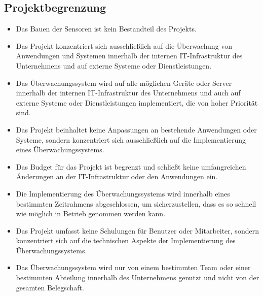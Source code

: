 \begin{flushleft}
\subsection{Projektbegrenzung}
\begin{itemize}
	\item Das Bauen der Sensoren ist kein Bestandteil des Projekts.
	\item Das Projekt konzentriert sich ausschließlich auf die Überwachung von Anwendungen und Systemen innerhalb der internen IT-Infrastruktur des Unternehmens und auf externe Systeme oder Dienstleistungen.
	\item Das Überwachungssystem wird auf alle möglichen Geräte oder Server innerhalb der internen IT-Infrastruktur des Unternehmens und auch auf externe Systeme oder Dienstleistungen implementiert, die von hoher Priorität sind.
	\item Das Projekt beinhaltet keine Anpassungen an bestehende Anwendungen oder Systeme, sondern konzentriert sich ausschließlich auf die Implementierung eines Überwachungssystems.
	\item Das Budget für das Projekt ist begrenzt und schließt keine umfangreichen Änderungen an der IT-Infrastruktur oder den Anwendungen ein.
	\item Die Implementierung des Überwachungssystems wird innerhalb eines bestimmten Zeitrahmens abgeschlossen, um sicherzustellen, dass es so schnell wie möglich in Betrieb genommen werden kann.
	\item Das Projekt umfasst keine Schulungen für Benutzer oder Mitarbeiter, sondern konzentriert sich auf die technischen Aspekte der Implementierung des Überwachungssystems.
	\item Das Überwachungssystem wird nur von einem bestimmten Team oder einer bestimmten Abteilung innerhalb des Unternehmens genutzt und nicht von der gesamten Belegschaft.
\end{itemize}



\end{flushleft}
